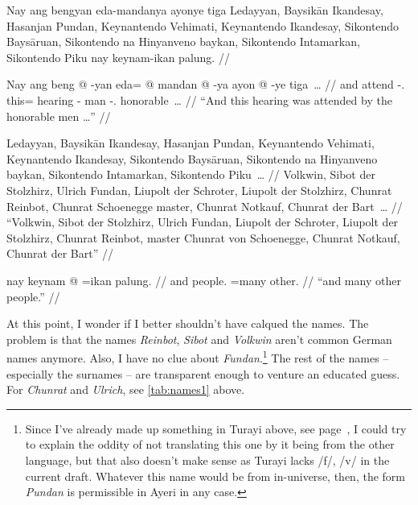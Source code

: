 \documentclass[12pt,paper=a4]{scrartcl}
\newcommand{\fw}[1]{\textit{#1}} %
\begin{document}

\pex 
	\glpreamble Nay ang bengyan eda-mandanya ayonye tiga Ledayyan, Baysikān 
		Ikandesay, Hasanjan Pundan, Keynantendo Vehimati, Keynantendo 
		Ikandesay, Sikontendo Baysāruan, Sikontendo na Hinyanveno 
		baykan, Sikontendo Intamarkan, Sikontendo Piku nay keynam-ikan 
		palung. //
	
	\a \begingl
		\gla Nay ang beng @ -yan eda= @ mandan @ -ya ayon @ -ye tiga~… //
		\glb and \AgtT{} attend -\Tpl{}.\M{} this= hearing -\Loc{} man 
			-\Pl{}.\Top{} honorable~… //
		\glft \enquote{And this hearing was attended by the honorable men 
			…} //
	\endgl
	
	\a \begingl
		\gla Ledayyan, Baysikān Ikandesay, Hasanjan Pundan, Keynantendo 
			Vehimati, Keynantendo Ikandesay, Sikontendo Baysāruan, 
			Sikontendo na Hinyanveno baykan, Sikontendo Intamarkan, 
			Sikontendo Piku~… //
		\glb Volkwin, Sibot {der Stolzhirz}, Ulrich Fundan, Liupolt 
			{der Schroter}, Liupolt {der Stolzhirz}, Chunrat 
			Reinbot, Chunrat \Gen{} Schoenegge master, Chunrat 
			Notkauf, Chunrat {der Bart}~… //
		\glft \enquote{Volkwin, Sibot der Stolzhirz, Ulrich Fundan, 
			Liupolt der Schroter, Liupolt der Stolzhirz, Chunrat 
			Reinbot, master Chunrat von Schoenegge, Chunrat Notkauf, 
			Chunrat der Bart} //
	\endgl
	
	\a \begingl
		\gla nay keynam @ =ikan palung. //
		\glb and people.\Top{} =many other. //
		\glft \enquote{and many other people.} //
	\endgl
\xe

At this point, I wonder if I better shouldn't have calqued the names. The 
problem is that the names \fw{Reinbot}, \fw{Sibot} and \fw{Volkwin} aren't 
common German names anymore. Also, I have no clue about 
\fw{Fundan}.\footnote{Since I've already made up something in Turayi above, 
see page~\pageref{ex:innomine}, I could try to explain the oddity of not 
translating this one by it being from the other language, but that also doesn't 
make sense as Turayi lacks /f/, /v/ in the current draft. Whatever this name 
would be from in-universe, then, the form \fw{Pundan} is permissible in Ayeri 
in any case.} The rest of the names -- especially the surnames -- are 
transparent enough to venture an educated guess. For \fw{Chunrat} and 
\fw{Ulrich}, see \autoref{tab:names1} above.
\end{document}
